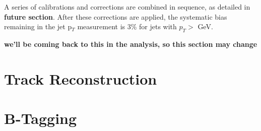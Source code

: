 A series of calibrations and corrections are combined in sequence, as detailed in \textbf{future section}.  After these corrections are applied, the systematic bias remaining in the jet p$_T$ measurement is 3\% for jets with $p_T>$ GeV.

\textbf{we'll be coming back to this in the analysis, so this section may change}


\section{Track Reconstruction}


\section{B-Tagging}
